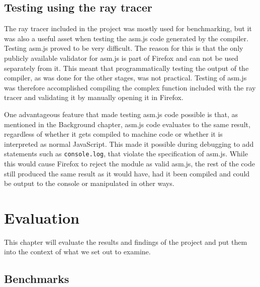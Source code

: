 \documentclass[11pt]{report}
\begin{document}

\section{Testing using the ray tracer}

The ray tracer included in the project was mostly used for benchmarking, but it was also a useful asset when testing the asm.js code generated by the compiler. Testing asm.js proved to be very difficult. The reason for this is that the only publicly available validator for asm.js is part of Firefox and can not be used separately from it. This meant that programmatically testing the output of the compiler, as was done for the other stages, was not practical. Testing of asm.js was therefore accomplished compiling the complex function included with the ray tracer and validating it by manually opening it in Firefox.

One advantageous feature that made testing asm.js code possible is that, as mentioned in the Background chapter, asm.js code evaluates to the same result, regardless of whether it gets compiled to machine code or whether it is interpreted as normal JavaScript. This made it possible during debugging to add statements such as \texttt{console.log}, that violate the specification of asm.js. While this would cause Firefox to reject the module as valid asm.js, the rest of the code still produced the same result as it would have, had it been compiled and could be output to the console or manipulated in other ways.

\chapter{Evaluation}
This chapter will evaluate the results and findings of the project and put them into the context of what we set out to examine.
\section{Benchmarks}
\end{document}
